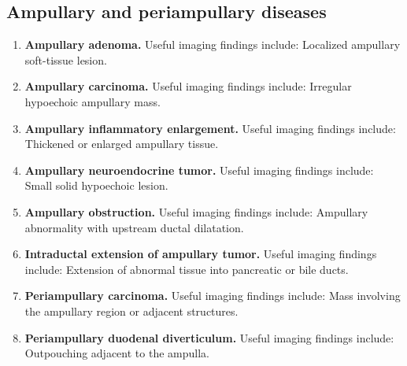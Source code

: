 \subsection{Ampullary and periampullary diseases}
\begin{enumerate}[leftmargin=*,itemsep=0.45em,topsep=0.4em]
\item \textbf{Ampullary adenoma.} Useful imaging findings include: Localized ampullary soft-tissue lesion.
\item \textbf{Ampullary carcinoma.} Useful imaging findings include: Irregular hypoechoic ampullary mass.
\item \textbf{Ampullary inflammatory enlargement.} Useful imaging findings include: Thickened or enlarged ampullary tissue.
\item \textbf{Ampullary neuroendocrine tumor.} Useful imaging findings include: Small solid hypoechoic lesion.
\item \textbf{Ampullary obstruction.} Useful imaging findings include: Ampullary abnormality with upstream ductal dilatation.
\item \textbf{Intraductal extension of ampullary tumor.} Useful imaging findings include: Extension of abnormal tissue into pancreatic or bile ducts.
\item \textbf{Periampullary carcinoma.} Useful imaging findings include: Mass involving the ampullary region or adjacent structures.
\item \textbf{Periampullary duodenal diverticulum.} Useful imaging findings include: Outpouching adjacent to the ampulla.
\end{enumerate}

